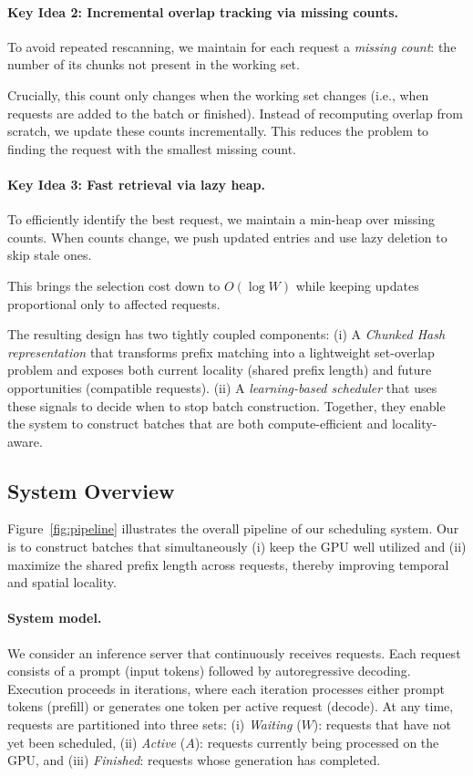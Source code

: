 \paragraph{Key Idea 2: Incremental overlap tracking via missing counts.}
To avoid repeated rescanning, we maintain for each request a \emph{missing count}: the number of its chunks not present in the working set.

Crucially, this count only changes when the working set changes (i.e., when requests are added to the batch or finished). Instead of recomputing overlap from scratch, we update these counts incrementally. This reduces the problem to finding the request with the smallest missing count.

\paragraph{Key Idea 3: Fast retrieval via lazy heap.}
To efficiently identify the best request, we maintain a min-heap over missing counts. When counts change, we push updated entries and use lazy deletion to skip stale ones.

This brings the selection cost down to $O(\log W)$ while keeping updates proportional only to affected requests.

The resulting design has two tightly coupled components: (i) A \emph{Chunked Hash representation} that transforms prefix matching into a lightweight set-overlap problem and exposes both current locality (shared prefix length) and future opportunities (compatible requests). (ii) A \emph{learning-based scheduler} that uses these signals to decide when to stop batch construction. Together, they enable the system to construct batches that are both compute-efficient and locality-aware.

\subsection{System Overview} 
\label{sec:system_overview}
Figure~\ref{fig:pipeline} illustrates the overall pipeline of our scheduling system. Our is to construct batches that simultaneously (i) keep the GPU well utilized and (ii) maximize the shared prefix length across requests, thereby improving temporal and spatial locality.

\paragraph{System model.}
We consider an inference server that continuously receives requests. Each request consists of a prompt (input tokens) followed by autoregressive decoding. Execution proceeds in iterations, where each iteration processes either prompt tokens (prefill) or generates one token per active request (decode). 
At any time, requests are partitioned into three sets:
(i) \emph{Waiting} ($W$): requests that have not yet been scheduled,
(ii) \emph{Active} ($A$): requests currently being processed on the GPU, and
(iii) \emph{Finished}: requests whose generation has completed.


